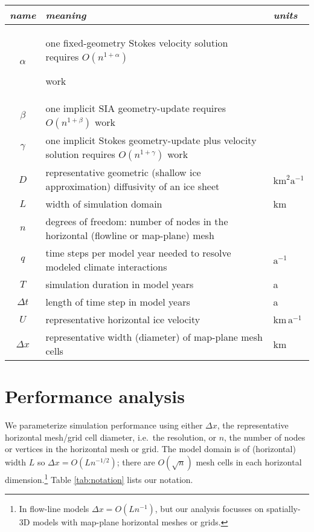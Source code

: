 \documentclass[twocolumn,letterpaper]{igs}
\begin{document}
\begin{table*}[ht]
{\normalsize
\begin{tabular}{cll}
\emph{name} & \emph{meaning} & \emph{units} \\ \hline
$\alpha$    & one fixed-geometry Stokes velocity solution requires $O(n^{1+\alpha})${\large \strut} work\\
$\beta$     & one implicit SIA geometry-update requires $O(n^{1+\beta})$ work \\
$\gamma$    & one implicit Stokes geometry-update plus velocity solution requires $O(n^{1+\gamma})$ work \\
$D$         & representative geometric (shallow ice approximation) diffusivity of an ice sheet & $\text{km}^2 \text{a}^{-1}$ \\
$L$         & width of simulation domain & km \\
$n$         & degrees of freedom: number of nodes in the horizontal (flowline or map-plane) mesh \\
$q$         & time steps per model year needed to resolve modeled climate interactions & $\text{a}^{-1}$ \\
$T$         & simulation duration in model years & a \\
$\Delta t$  & length of time step in model years & a \\
$U$         & representative horizontal ice velocity & $\text{km}\,\text{a}^{-1}$ \\
$\Delta x$  & representative width (diameter) of map-plane mesh cells & km
\end{tabular}
}
\caption{Notation for performance modeling.  Parameters $\alpha,\beta,\gamma,n$ are pure numbers.}
\label{tab:notation}
\end{table*}


\section{Performance analysis}

We parameterize simulation performance using either $\Delta x$, the representative horizontal mesh/grid cell diameter, i.e.~the resolution, or $n$, the number of nodes or vertices in the horizontal mesh or grid.  The model domain is of (horizontal) width $L$ so $\Delta x = O(L n^{-1/2})$; there are $O(\sqrt{n})$ mesh cells in each horizontal dimension.\footnote{In flow-line models $\Delta x = O(L n^{-1})$, but our analysis focusses on spatially-3D models with map-plane horizontal meshes or grids.}  Table \ref{tab:notation} lists our notation.
\end{document}
